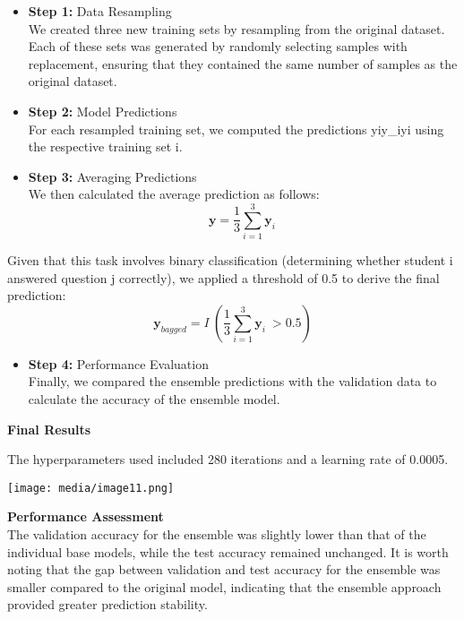 \begin{itemize}
\item
  \textbf{Step 1:} Data Resampling\\
  We created three new training sets by resampling from the original
  dataset. Each of these sets was generated by randomly selecting
  samples with replacement, ensuring that they contained the same number
  of samples as the original dataset.
\item
  \textbf{Step 2:} Model Predictions\\
  For each resampled training set, we computed the predictions
  yiy\_iyi\hspace{0pt} using the respective training set i.
\item
  \textbf{Step 3:} Averaging Predictions\\
  We then calculated the average prediction as follows:\\
  \[\mathbf{y} = \frac{1}{3}\sum_{i = 1}^{3}{\mathbf{y}_{i}\ }\]
\end{itemize}

Given that this task involves binary classification (determining whether
student i answered question j correctly), we applied a threshold of 0.5
to derive the final prediction:\\
\[\mathbf{y}_{bagged} = I\ \left( \frac{1}{3}\sum_{i = 1}^{3}{\mathbf{y}_{i}\ } > 0.5 \right)\]

\begin{itemize}
\item
  \textbf{Step 4:} Performance Evaluation\\
  Finally, we compared the ensemble predictions with the validation data
  to calculate the accuracy of the ensemble model.
\end{itemize}

\textbf{Final Results}

The hyperparameters used included 280 iterations and a learning rate of
0.0005.

\texttt{[image: media/image11.png]}

\textbf{Performance Assessment\\
}The validation accuracy for the ensemble was slightly lower than that
of the individual base models, while the test accuracy remained
unchanged. It is worth noting that the gap between validation and test
accuracy for the ensemble was smaller compared to the original model,
indicating that the ensemble approach provided greater prediction
stability.

